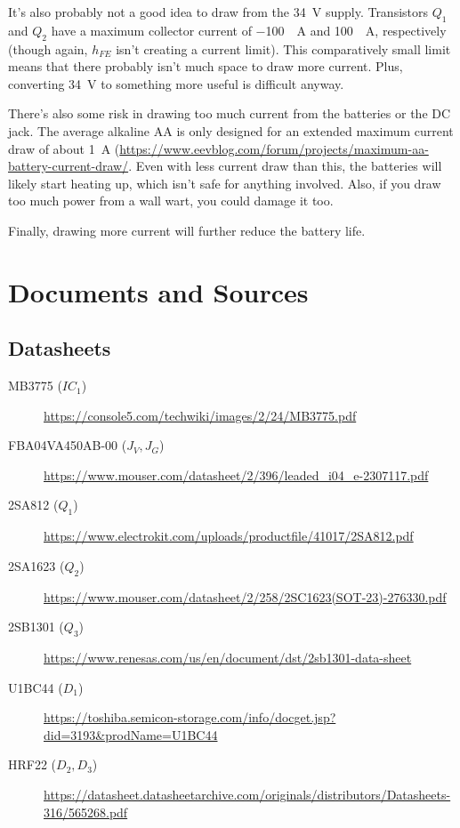 \documentclass{article}
\newcommand{\model}{\textsf}
\begin{document}
It's also probably not a good idea to draw from the \qty{34}{\volt}
supply. Transistors $Q_1$ and $Q_2$ have a maximum collector current
of \qty{-100}{\milli{}A} and \qty{100}{\milli{}A}, respectively
(though again, $h_{FE}$ isn't creating a current limit). This
comparatively small limit means that there probably isn't much space
to draw more current. Plus, converting \qty{34}{\volt} to something
more useful is difficult anyway.

There's also some risk in drawing too much current from the batteries
or the DC jack. The average alkaline AA is only designed for an
extended maximum current draw of about \qty{1}{A}
(\url{https://www.eevblog.com/forum/projects/maximum-aa-battery-current-draw/}.
Even with less current draw than this, the batteries will likely start
heating up, which isn't safe for anything involved. Also, if you draw
too much power from a wall wart, you could damage it too.

Finally, drawing more current will further reduce the battery life.

\section{Documents and Sources}
\label{sec:documents}
\subsection{Datasheets}
\begin{description}
\item[\model{MB3775} ($IC_1$)]
  \url{https://console5.com/techwiki/images/2/24/MB3775.pdf}
\item[\model{FBA04VA450AB-00} ($J_V,J_G$)]
  \url{https://www.mouser.com/datasheet/2/396/leaded_i04_e-2307117.pdf}
\item[\model{2SA812} ($Q_1$)]
  \url{https://www.electrokit.com/uploads/productfile/41017/2SA812.pdf}
\item[\model{2SA1623} ($Q_2$)]
  \url{https://www.mouser.com/datasheet/2/258/2SC1623(SOT-23)-276330.pdf}
\item[\model{2SB1301} ($Q_3$)]
  \url{https://www.renesas.com/us/en/document/dst/2sb1301-data-sheet}
\item[\model{U1BC44} ($D_1$)]
  \url{https://toshiba.semicon-storage.com/info/docget.jsp?did=3193&prodName=U1BC44}
  
\item[\model{HRF22} ($D_2,D_3$)]
  \url{https://datasheet.datasheetarchive.com/originals/distributors/Datasheets-316/565268.pdf}
\end{description}
\end{document}

